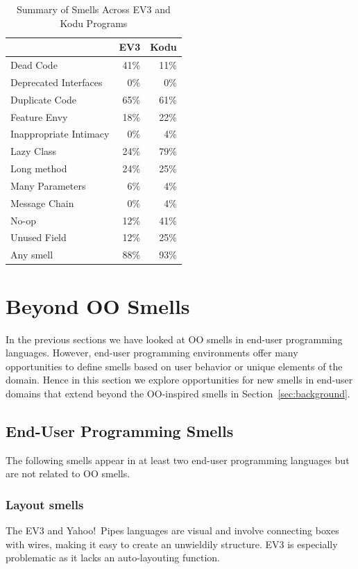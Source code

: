 \documentclass[conference]{IEEEtran}
\begin{document}
\begin{table}
\caption{Summary of Smells Across EV3 and Kodu Programs \label{tab:smellsummary}}
\begin{small}
\begin{center}
\begin{tabular}{l | r r}
&EV3&Kodu\\ \hline
Dead Code&41\%&11\%\\
Deprecated Interfaces & 0\% & 0\%\\
Duplicate Code&65\%&61\%\\
Feature Envy&18\%&22\%\\
Inappropriate Intimacy&0\%&4\%\\
Lazy Class&24\%&79\%\\
Long method&24\%&25\%\\
Many Parameters&6\%&4\%\\
Message Chain&0\%&4\%\\
No-op&12\%&41\%\\
Unused Field&12\%&25\%\\ \hline
Any smell & 88\% & 93\%
\end{tabular}
\end{center}
\end{small}
\end{table}


\section{Beyond OO Smells}
\label{sec:beyond}

\label{sec:background:domain}
In the previous sections we have looked at OO smells in end-user programming languages. However, end-user programming environments offer many opportunities to define smells based on user behavior or unique elements of the domain. Hence in this section we explore opportunities for new smells in end-user domains that extend beyond the OO-inspired smells in Section~\ref{sec:background}. 

\subsection{End-User Programming Smells}
\label{sec:eupsmells}
The following smells appear in at least two  end-user programming languages but are not related to OO smells. 

\subsubsection{Layout smells}
The EV3 and Yahoo!\ Pipes languages are visual and involve connecting boxes with wires, making it easy to create an unwieldily structure. EV3 is especially problematic as it lacks an auto-layouting function.
\end{document}

